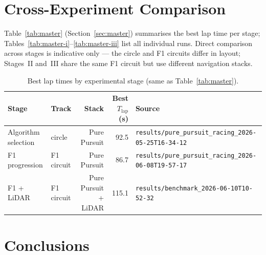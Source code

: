 \documentclass[11pt,a4paper]{article}
\newcommand{\runref}[1]{\texttt{results/#1}}
\begin{document}
\section{Cross-Experiment Comparison}
\label{sec:cross}

Table~\ref{tab:master} (Section~\ref{sec:master}) summarises the best lap time per stage;
Tables~\ref{tab:master-i}--\ref{tab:master-iii} list all individual runs.
Direct comparison across stages is indicative only --- the circle and F1 circuits
differ in layout; Stages~II and~III share the same F1 circuit but use different
navigation stacks.

\begin{table}[H]
  \centering
  \caption{Best lap times by experimental stage (same as Table~\ref{tab:master}).}
  \label{tab:cross-best}
  \begin{tabular}{@{}llrrl@{}}
    \toprule
    Stage & Track & Stack & Best $T_{\mathrm{lap}}$ (s) & Source \\
    \midrule
    Algorithm selection & circle     & Pure Pursuit         & 92.5  & \runref{pure\_pursuit\_racing\_2026-05-25T16-34-12} \\
    F1 progression      & F1 circuit & Pure Pursuit         & 86.7  & \runref{pure\_pursuit\_racing\_2026-06-08T19-57-17} \\
    F1 + LiDAR          & F1 circuit & Pure Pursuit + LiDAR & 115.1 & \runref{benchmark\_2026-06-10T10-52-32} \\
    \bottomrule
  \end{tabular}
\end{table}

\section{Conclusions}
\label{sec:conclusions}
\end{document}
